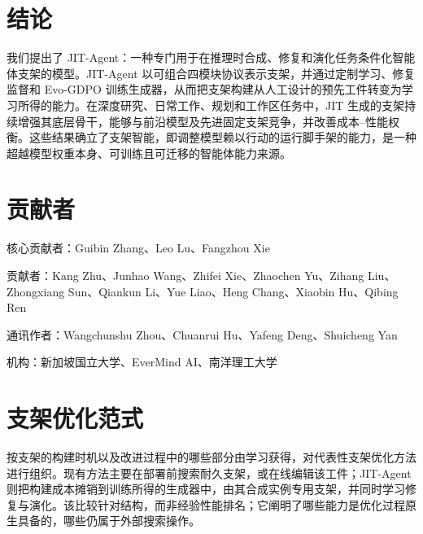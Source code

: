 \documentclass{article}
\newcommand{\ourmethod}{JIT-Agent\xspace}
\begin{document}
\vspace{-0.5em}
\section{结论}
\vspace{-0.5em}
我们提出了 \ourmethod：一种专门用于在推理时合成、修复和演化任务条件化智能体支架的模型。\ourmethod 以可组合四模块协议表示支架，并通过定制学习、修复监督和 Evo-GDPO 训练生成器，从而把支架构建从人工设计的预先工件转变为学习所得的能力。在深度研究、日常工作、规划和工作区任务中，JIT 生成的支架持续增强其底层骨干，能够与前沿模型及先进固定支架竞争，并改善成本--性能权衡。这些结果确立了支架智能，即调整模型赖以行动的运行脚手架的能力，是一种超越模型权重本身、可训练且可迁移的智能体能力来源。


\vspace{-0.5em}
\section*{贡献者}
\vspace{-0.5em}
核心贡献者：Guibin Zhang、Leo Lu、Fangzhou Xie

贡献者：Kang Zhu、Junhao Wang、Zhifei Xie、Zhaochen Yu、Zihang Liu、Zhongxiang Sun、Qiankun Li、Yue Liao、Heng Chang、Xiaobin Hu、Qibing Ren

通讯作者：Wangchunshu Zhou、Chuanrui Hu、Yafeng Deng、Shuicheng Yan

机构：新加坡国立大学、EverMind AI、南洋理工大学







\clearpage
\appendix
\vspace{-0.5em}
\section{支架优化范式}
\vspace{-0.5em}
\label{sec:harness_optimization_appendix}
 按支架的构建时机以及改进过程中的哪些部分由学习获得，对代表性支架优化方法进行组织。现有方法主要在部署前搜索耐久支架，或在线编辑该工件；\ourmethod 则把构建成本摊销到训练所得的生成器中，由其合成实例专用支架，并同时学习修复与演化。该比较针对结构，而非经验性能排名；它阐明了哪些能力是优化过程原生具备的，哪些仍属于外部搜索操作。
\end{document}
